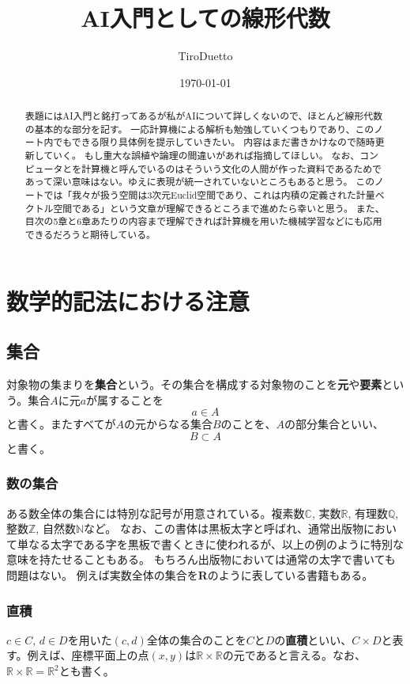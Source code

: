 \documentclass[10pt]{jsarticle}
\title{AI入門としての線形代数}
\author{TiroDuetto}
\date{\today}
\theoremstyle{definition}%
\numberwithin{equation}{section}%
\begin{document}
\maketitle

\begin{abstract}
表題にはAI入門と銘打ってあるが私がAIについて詳しくないので、ほとんど線形代数の基本的な部分を記す。
一応計算機による解析も勉強していくつもりであり、このノート内でもできる限り具体例を提示していきたい。
内容はまだ書きかけなので随時更新していく。
もし重大な誤植や論理の間違いがあれば指摘してほしい。
なお、コンピュータとを計算機と呼んでいるのはそういう文化の人間が作った資料であるためであって深い意味はない。ゆえに表現が統一されていないところもあると思う。
このノートでは「我々が扱う空間は3次元Euclid空間であり、これは内積の定義された計量ベクトル空間である」という文章が理解できるところまで進めたら幸いと思う。
また、目次の5章と6章あたりの内容まで理解できれば計算機を用いた機械学習などにも応用できるだろうと期待している。
\end{abstract}
\tableofcontents
\setcounter{section}{-1}
\section{数学的記法における注意}
\subsection{集合}
対象物の集まりを{\bf 集合}という。その集合を構成する対象物のことを{\bf 元}や{\bf 要素}という。集合$A$に元$a$が属することを
\begin{equation}
  a \in A 
\end{equation}
と書く。またすべてが$A$の元からなる集合$B$のことを、$A$の部分集合といい、
\begin{equation}
  B \subset A
\end{equation}
と書く。
\subsubsection{数の集合}
ある数全体の集合には特別な記号が用意されている。複素数$\mathbb{C}$, 実数$\mathbb{R}$, 有理数$\mathbb{Q}$, 整数$\mathbb{Z}$, 自然数$\mathbb{N}$など。
なお、この書体は黒板太字と呼ばれ、通常出版物において単なる太字である字を黒板で書くときに使われるが、以上の例のように特別な意味を持たせることもある。
もちろん出版物においては通常の太字で書いても問題はない。
例えば実数全体の集合を{\bf R}のように表している書籍もある。
\subsubsection{直積}
$c \in C, \, d\in D$を用いた$(c,d)$全体の集合のことを$C$と$D$の{\bf 直積}といい、$C\times D$と表す。例えば、座標平面上の点$(x,y)$は$\mathbb{R}\times \mathbb{R}$の元であると言える。なお、$\mathbb{R}\times \mathbb{R}=\mathbb{R}^{2}$とも書く。
\end{document}
